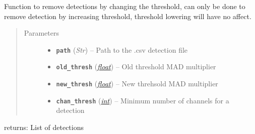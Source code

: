 \documentclass[a4paper,10pt,english]{sphinxmanual}
\begin{document}
\begin{fulllineitems}
\label{submodules/utils.clustering:clustering.re_thresh_csv}
Function to remove detections by changing the threshold, can only be done
to remove detection by increasing threshold, threshold lowering will have
no affect.
\begin{quote}\begin{description}
\item[{Parameters}] \leavevmode\begin{itemize}
\item {} 
\textbf{\texttt{path}} (\emph{Str}) -- Path to the .csv detection file

\item {} 
\textbf{\texttt{old\_thresh}} (\href{https://docs.python.org/library/functions.html\#float}{\emph{float}}) -- Old threshold MAD multiplier

\item {} 
\textbf{\texttt{new\_thresh}} (\href{https://docs.python.org/library/functions.html\#float}{\emph{float}}) -- New threhsold MAD multiplier

\item {} 
\textbf{\texttt{chan\_thresh}} (\href{https://docs.python.org/library/functions.html\#int}{\emph{int}}) -- Minimum number of channels for a detection

\end{itemize}

\end{description}\end{quote}

returns: List of detections

\end{fulllineitems}

\end{document}
